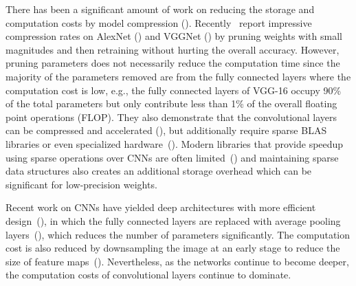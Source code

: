 \documentclass{article} \usepackage{iclr2017_conference,times}
\begin{document}
There has been a significant amount of work on reducing the storage and computation costs by model compression  (\cite{obd, OBS, srinivas2015data,han2015learning, mariet2015diversity}).
Recently~\cite{han2015learning, deepcompression} report impressive compression rates on AlexNet (\cite{alexnet}) and VGGNet (\cite{vgg}) by pruning weights with small magnitudes and then retraining without hurting the overall accuracy. 
However, pruning parameters does not necessarily reduce the computation time since the majority of the parameters removed are from the fully connected layers where the computation cost is low, 
e.g., the fully connected layers of VGG-16 occupy 90\% of the total parameters but only contribute less than 1\% of the overall floating point operations (FLOP).
They also demonstrate that the convolutional layers can be compressed and accelerated (\cite{squeezenet}), but additionally require sparse BLAS libraries or even specialized hardware~(\cite{han2016eie}).
Modern libraries that provide speedup using sparse operations over CNNs are often limited~(\cite{googlenet,sparce_cnn}) and maintaining sparse data structures also creates an additional storage overhead which can be significant for low-precision weights. 

Recent work on CNNs have yielded deep architectures with more efficient design~(\cite{googlenet, inceptionv3, he2015convolutional, resnet}), in which the fully connected layers are replaced with average pooling layers~(\cite{nin, resnet}), which reduces the number of parameters significantly.
The computation cost is also reduced by downsampling the image at an early stage to reduce the size of feature maps~(\cite{he2015convolutional}).
Nevertheless, as the networks continue to become deeper, the computation costs of convolutional layers continue to dominate. 
\end{document}
